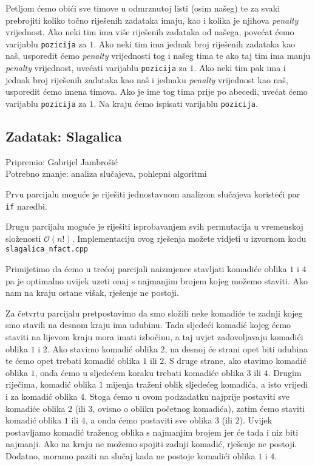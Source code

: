 \documentclass[a4paper]{article}
\begin{document}
Petljom ćemo obići sve timove u odmrznutoj listi (osim našeg) te za svaki
prebrojiti koliko točno riješenih zadataka imaju, kao i kolika je njihova
\textit{penalty} vrijednost. Ako neki tim ima više riješenih zadataka od
našega, povećat ćemo varijablu \texttt{pozicija} za $1$. Ako neki tim ima
jednak broj riješenih zadataka kao naš, usporedit ćemo \textit{penalty}
vrijednosti tog i našeg tima te ako taj tim ima manju \textit{penalty}
vrijednost, uvećati varijablu \texttt{pozicija} za $1$. Ako neki tim pak ima i
jednak broj riješenih zadataka kao naš i jednaku \textit{penalty} vrijednost
kao naš, usporedit ćemo imena timova. Ako je ime tog tima prije po abecedi,
uvećat ćemo varijablu \texttt{pozicija} za $1$. Na kraju ćemo ispisati
varijablu \texttt{pozicija}.

\subsection*{Zadatak: Slagalica}
\textsf{Pripremio: Gabrijel Jambrošić}\\
\textsf{Potrebno znanje: analiza slučajeva, pohlepni algoritmi}

Prvu parcijalu moguće je riješiti jednostavnom analizom slučajeva koristeći par
\texttt{if} naredbi.

Drugu parcijalu moguće je riješiti isprobavanjem svih permutacija u vremenskoj
složenosti $\mathcal{O}(n!)$. Implementaciju ovog rješenja možete vidjeti u
izvornom kodu \texttt{slagalica\_nfact.cpp}

Primijetimo da ćemo u trećoj parcijali naizmjence stavljati komadiće oblika $1$
i $4$ pa je optimalno uvijek uzeti onaj s najmanjim brojem kojeg možemo staviti.
Ako nam na kraju ostane višak, rješenje ne postoji.

Za četvrtu parcijalu pretpostavimo da smo složili neke komadiće te zadnji kojeg
smo stavili na desnom kraju ima udubinu. Tada sljedeći komadić kojeg ćemo
staviti na lijevom kraju mora imati izbočinu, a taj uvjet zadovoljavaju
komadići oblika $1$ i $2$. Ako stavimo komadić oblika $2$, na desnoj će strani
opet biti udubina te ćemo opet trebati komadić oblika $1$ ili $2$. S druge
strane, ako stavimo komadić oblika $1$, onda ćemo u sljedećem koraku trebati
komadiće oblika $3$ ili $4$. Drugim riječima, komadić oblika $1$ mijenja
traženi oblik sljedećeg komadića, a isto vrijedi i za komadić oblika $4$. Stoga
ćemo u ovom podzadatku najprije postaviti sve komadiće oblika $2$ (ili $3$,
ovisno o obliku početnog komadića), zatim ćemo staviti komadić oblika $1$ ili
$4$, a onda ćemo postaviti sve oblika $3$ (ili $2$). Uvijek postavljamo komadić
traženog oblika s najmanjim brojem jer će tada i niz biti najmanji. Ako na
kraju ne možemo spojiti zadnji komadić, rješenje ne postoji. Dodatno, moramo
paziti na slučaj kada ne postoje komadići oblika $1$ i $4$.
\end{document}
